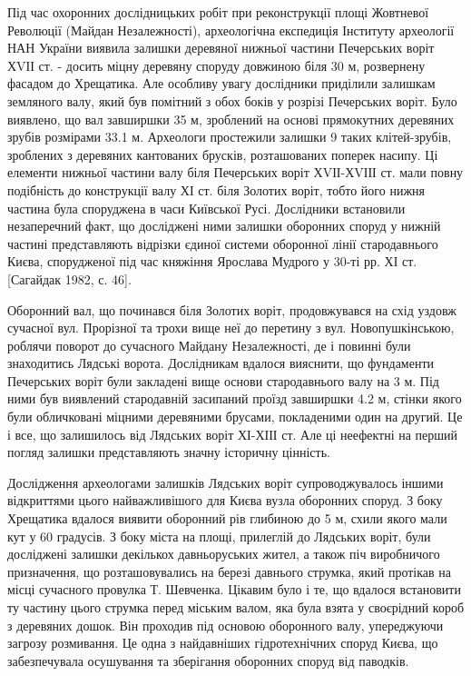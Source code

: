 Під час охоронних дослідницьких робіт при реконструкції площі Жовтневої
Революції (Майдан Незалежності), археологічна експедиція Інституту археології
НАН України виявила залишки деревяної нижньої частини Печерських воріт ХVІІ ст.
- досить міцну деревяну споруду довжиною біля 30 м, розвернену фасадом до
Хрещатика. Але особливу увагу дослідники приділили залишкам земляного валу,
який був помітний з обох боків у розрізі Печерських воріт. Було виявлено, що
вал завширшки 35 м, зроблений на основі прямокутних деревяних зрубів розмірами
33.1 м. Археологи простежили залишки 9 таких клітей-зрубів, зроблених з
деревяних кантованих брусків, розташованих поперек насипу. Ці елементи нижньої
частини валу біля Печерських воріт ХVІІ-ХVІІІ ст. мали повну подібність до
конструкції валу ХІ ст. біля Золотих воріт, тобто його нижня частина була
споруджена в часи Київської Русі. Дослідники встановили незаперечний факт, що
досліджені ними залишки оборонних споруд у нижній частині представляють
відрізки єдиної системи оборонної лінії стародавнього Києва, спорудженої під
час княжіння Ярослава Мудрого у 30-ті рр. ХІ ст. [Сагайдак 1982, с. 46].

Оборонний вал, що починався біля Золотих воріт, продовжувався на схід уздовж
сучасної вул. Прорізної та трохи вище неї до перетину з вул. Новопушкінською,
роблячи поворот до сучасного Майдану Незалежності, де і повинні були
знаходитись Лядські ворота. Дослідникам вдалося вияснити, що фундаменти
Печерських воріт були закладені вище основи стародавнього валу на 3 м. Під ними
був виявлений стародавній засипаний проїзд завширшки 4.2 м, стінки якого були
обличковані міцними деревяними брусами, покладеними один на другий. Це і все,
що залишилось від Лядських воріт ХІ-ХІІІ ст. Але ці неефектні на перший погляд
залишки представляють значну історичну цінність.

Дослідження археологами залишків Лядських воріт супроводжувалось іншими
відкриттями цього найважливішого для Києва вузла оборонних споруд. З боку
Хрещатика вдалося виявити оборонний рів глибиною до 5 м, схили якого мали кут у
60 градусів. З боку міста на площі, прилеглій до Лядських воріт, були
досліджені залишки декількох давньоруських жител, а також піч виробничого
призначення, що розташовувались на березі давнього струмка, який протікав на
місці сучасного провулка Т. Шевченка. Цікавим було і те, що вдалося встановити
ту частину цього струмка перед міським валом, яка була взята у своєрідний короб
з деревяних дошок. Він проходив під основою оборонного валу, упереджуючи
загрозу розмивання. Це одна з найдавніших гідротехнічних споруд Києва, що
забезпечувала осушування та зберігання оборонних споруд від паводків.

